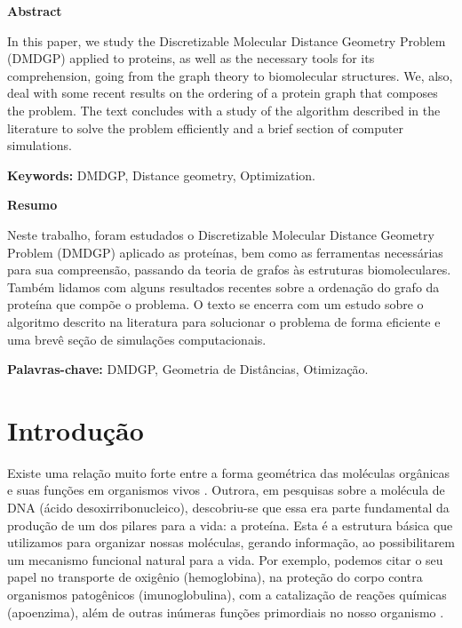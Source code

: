 \documentclass[a4paper,12pt]{article}
\begin{document}
	\begin{center}
		\large
		\textbf{Abstract}
	\end{center}
	
	
	In this paper, we study the Discretizable Molecular Distance Geometry Problem (DMDGP) applied to proteins, as well as the necessary tools for its comprehension, going from the graph theory to biomolecular structures. We, also, deal with some recent results on the ordering of a protein graph that composes the problem. The text concludes with a study of the algorithm described in the literature to solve the problem efficiently and a brief section of computer simulations.
	
	\textbf{Keywords:} DMDGP, Distance geometry, Optimization.
	
	
	\vspace{2cm}	
	\begin{center}
		\large
		\textbf{Resumo}
	\end{center}
	
	Neste trabalho, foram estudados o Discretizable Molecular Distance Geometry Problem (DMDGP) aplicado as proteínas, bem como as ferramentas necessárias para sua compreensão, passando da teoria de grafos às estruturas biomoleculares. Também lidamos com alguns resultados recentes sobre a ordenação do grafo da proteína que compõe o problema. O texto se encerra com um estudo sobre o algoritmo descrito na literatura para solucionar o problema de forma eficiente e uma brevê seção de simulações computacionais.
	
	\textbf{Palavras-chave:} DMDGP, Geometria de Distâncias, Otimização.
	
	
	\newpage
	\section{Introdução}
	Existe uma relação muito forte entre a forma geométrica das moléculas orgânicas e suas funções em organismos vivos \cite{bioquimicaLehninger}. Outrora, em pesquisas sobre a molécula de DNA (ácido desoxirribonucleico), descobriu-se que essa era parte fundamental da produção de um dos pilares para a vida: a proteína. Esta é a estrutura básica que utilizamos para organizar nossas moléculas, gerando informação, ao possibilitarem um mecanismo funcional natural para a vida. Por exemplo, podemos citar o seu papel no transporte de oxigênio (hemoglobina), na proteção do corpo contra organismos patogênicos (imunoglobulina), com a catalização de reações químicas (apoenzima), além de outras inúmeras funções primordiais no nosso organismo \cite{fidalgotese}.
	
\end{document}
